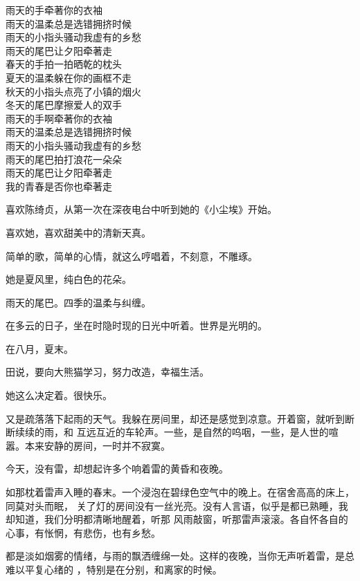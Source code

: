 \documentclass[12pt,a4paper]{article}
\begin{document}
		\longpoem{}{}{}
		雨天的手牵著你的衣袖 \\
		雨天的温柔总是选错拥挤时候 \\
		雨天的小指头骚动我虚有的乡愁 \\
		雨天的尾巴让夕阳牵著走 \\
		春天的手拍一拍晒乾的枕头 \\
		夏天的温柔躲在你的画框不走 \\
		秋天的小指头点亮了小镇的烟火 \\
		冬天的尾巴摩擦爱人的双手 \\
		雨天的手啊牵著你的衣袖 \\
		雨天的温柔总是选错拥挤时候 \\
		雨天的小指头骚动我虚有的乡愁 \\
		雨天的尾巴拍打浪花一朵朵 \\
		雨天的尾巴让夕阳牵著走 \\
		我的青春是否你也牵著走
		\endlongpoem


		喜欢陈绮贞，从第一次在深夜电台中听到她的《小尘埃》开始。\par
		喜欢她，喜欢甜美中的清新天真。\par
		简单的歌，简单的心情，就这么哼唱着，不刻意，不雕琢。\par
		她是夏风里，纯白色的花朵。

		雨天的尾巴。四季的温柔与纠缠。\par
		在多云的日子，坐在时隐时现的日光中听着。世界是光明的。\par
		在八月，夏末。

		田说，要向大熊猫学习，努力改造，幸福生活。\par
		她这么决定着。很快乐。

	\endwriting



		又是疏落落下起雨的天气。我躲在房间里，却还是感觉到凉意。开着窗，就听到断断续续的雨，和
	互远互近的车轮声。一些，是自然的呜咽，一些，是人世的喧嚣。本来安静的房间，一时并不寂寞。

		今天，没有雷，却想起许多个响着雷的黄昏和夜晚。

		如那枕着雷声入睡的春末。一个浸泡在碧绿色空气中的晚上。在宿舍高高的床上，同莫对头而眠，
	关了灯的房间没有一丝光亮。没有人言语，似乎是都已熟睡，我却知道，我们分明都清晰地醒着，听那
	风雨敲窗，听那雷声滚滚。各自怀各自的心事，有怅惘，有悲伤，也有乡愁。

		都是淡如烟雾的情绪，与雨的飘洒缠绵一处。这样的夜晚，当你无声听着雷，是总难以平复心绪的
	，特别是在分别，和离家的时候。
\end{document}

